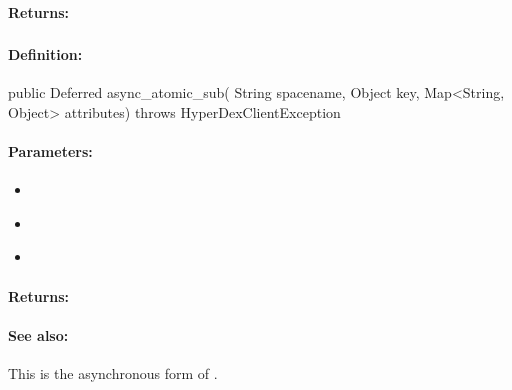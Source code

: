 \paragraph{Returns:}


\pagebreak
\subsubsection{}
\label{api:java:async_atomic_sub}


\paragraph{Definition:}
\begin{javacode}
public Deferred async_atomic_sub(
        String spacename,
        Object key,
        Map<String, Object> attributes) throws HyperDexClientException
\end{javacode}

\paragraph{Parameters:}
\begin{itemize}[noitemsep]
\item {}\\

\item {}\\

\item {}\\

\end{itemize}

\paragraph{Returns:}


\paragraph{See also:}  This is the asynchronous form of .

\pagebreak
